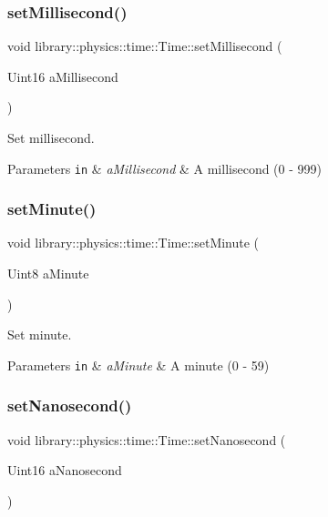 \subsubsection{\texorpdfstring{set\+Millisecond()}{setMillisecond()}}
{\footnotesize\ttfamily void library\+::physics\+::time\+::\+Time\+::set\+Millisecond (\begin{DoxyParamCaption}\item[{Uint16}]{a\+Millisecond }\end{DoxyParamCaption})}



Set millisecond. 


\begin{DoxyParams}[1]{Parameters}
\mbox{\tt in}  & {\em a\+Millisecond} & A millisecond (0 -\/ 999) \\
\hline
\end{DoxyParams}
\mbox{\label{classlibrary_1_1physics_1_1time_1_1_time_a62140a0b62a0d6264b4b1f65106e6d21}} 
\subsubsection{\texorpdfstring{set\+Minute()}{setMinute()}}
{\footnotesize\ttfamily void library\+::physics\+::time\+::\+Time\+::set\+Minute (\begin{DoxyParamCaption}\item[{Uint8}]{a\+Minute }\end{DoxyParamCaption})}



Set minute. 


\begin{DoxyParams}[1]{Parameters}
\mbox{\tt in}  & {\em a\+Minute} & A minute (0 -\/ 59) \\
\hline
\end{DoxyParams}
\mbox{\label{classlibrary_1_1physics_1_1time_1_1_time_a2d941601ab94abc646d085e7958d1739}} 
\subsubsection{\texorpdfstring{set\+Nanosecond()}{setNanosecond()}}
{\footnotesize\ttfamily void library\+::physics\+::time\+::\+Time\+::set\+Nanosecond (\begin{DoxyParamCaption}\item[{Uint16}]{a\+Nanosecond }\end{DoxyParamCaption})}



